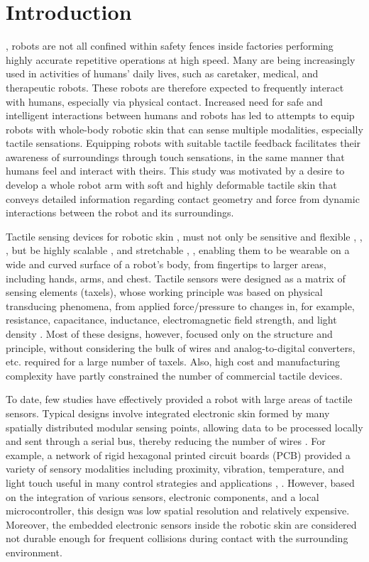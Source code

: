 \documentclass[10pt,letterpaper,journal,final,twoside,twocolumn,nofonttune]{IEEEtran}
\begin{document}
\section{Introduction}
, robots are not all confined within safety fences inside factories performing highly accurate repetitive operations at high speed. Many are being increasingly used in activities of humans' daily lives, such as caretaker, medical, and therapeutic robots. These robots are therefore expected to frequently interact with humans, especially via physical contact. Increased need for safe and intelligent interactions between humans and robots has led to attempts to equip robots with whole-body robotic skin that can sense multiple modalities, especially tactile sensations. Equipping robots with suitable tactile feedback facilitates their awareness of surroundings through touch sensations, in the same manner that humans feel and interact with theirs. This study was motivated by a desire to develop a whole robot arm with soft and highly deformable tactile skin that conveys detailed information regarding contact geometry and force from dynamic interactions between the robot and its surroundings.

Tactile sensing devices for robotic skin \cite{Soni}, \cite{Shih} must not only be sensitive and flexible \cite{Zang}, \cite{Kwon}, \cite{Chortos}, but be highly scalable \cite{Lee}, \cite{Sundaram} and stretchable \cite{Amjadi}, \cite{Wang}, enabling them to be wearable on a wide and curved surface of a robot's body, from fingertips to larger areas, including hands, arms, and chest. Tactile sensors were designed as a matrix of sensing elements (taxels), whose working principle was based on physical transducing phenomena, from applied force/pressure to changes in, for example, resistance, capacitance, inductance, electromagnetic field strength, and light density \cite{Ravinder}. Most of these designs, however, focused only on the structure and principle, without considering the bulk of wires and analog-to-digital converters, etc. required for a large number of taxels. Also, high cost and manufacturing complexity have partly constrained the number of commercial tactile devices.

To date, few studies have effectively provided a robot with large areas of tactile sensors.  Typical designs involve integrated electronic skin formed by many spatially distributed modular sensing points, allowing data to be processed locally and sent through a serial bus, thereby reducing the number of wires \cite{Schmitz}. For example, a network of rigid hexagonal printed circuit boards (PCB) provided a variety of sensory modalities including proximity, vibration, temperature, and light touch \cite{Philipp} useful in many control strategies and applications \cite{Quentin}, \cite{Cheng}. However, based on the integration of various sensors, electronic components, and a local microcontroller, this design was low spatial resolution and relatively expensive. Moreover, the embedded electronic  sensors  inside  the robotic  skin  are  considered  not durable enough for frequent collisions during contact with the surrounding environment. 
\end{document}
